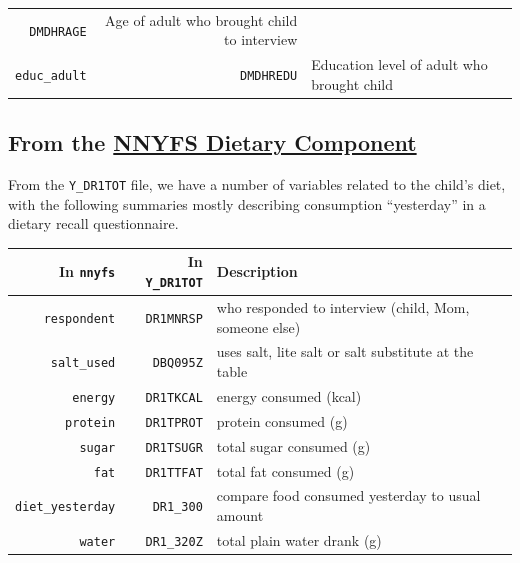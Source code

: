 \documentclass[
]{book}
\begin{document}
\begin{longtable}[]{@{}rrl@{}}
\begin{minipage}[t]{0.16\columnwidth}
\texttt{DMDHRAGE}\strut
\end{minipage} & \begin{minipage}[t]{0.56\columnwidth}\raggedright
Age of adult who brought child to interview\strut
\end{minipage}\tabularnewline
\begin{minipage}[t]{0.20\columnwidth}\raggedleft
\texttt{educ\_adult}\strut
\end{minipage} & \begin{minipage}[t]{0.16\columnwidth}\raggedleft
\texttt{DMDHREDU}\strut
\end{minipage} & \begin{minipage}[t]{0.56\columnwidth}\raggedright
Education level of adult who brought child\strut
\end{minipage}\tabularnewline
\bottomrule
\end{longtable}

\hypertarget{from-the-nnyfs-dietary-component}{%
\subsection{\texorpdfstring{From the \href{https://wwwn.cdc.gov/nchs/nhanes/search/nnyfsdata.aspx?Component=Dietary}{NNYFS Dietary Component}}{From the NNYFS Dietary Component}}\label{from-the-nnyfs-dietary-component}}

From the \texttt{Y\_DR1TOT} file, we have a number of variables related to the child's diet, with the following summaries mostly describing consumption ``yesterday'' in a dietary recall questionnaire.

\begin{longtable}[]{@{}rrl@{}}
\toprule
In \texttt{nnyfs} & In \texttt{Y\_DR1TOT} & Description\tabularnewline
\midrule
\endhead
\texttt{respondent} & \texttt{DR1MNRSP} & who responded to interview (child, Mom, someone else)\tabularnewline
\texttt{salt\_used} & \texttt{DBQ095Z} & uses salt, lite salt or salt substitute at the table\tabularnewline
\texttt{energy} & \texttt{DR1TKCAL} & energy consumed (kcal)\tabularnewline
\texttt{protein} & \texttt{DR1TPROT} & protein consumed (g)\tabularnewline
\texttt{sugar} & \texttt{DR1TSUGR} & total sugar consumed (g)\tabularnewline
\texttt{fat} & \texttt{DR1TTFAT} & total fat consumed (g)\tabularnewline
\texttt{diet\_yesterday} & \texttt{DR1\_300} & compare food consumed yesterday to usual amount\tabularnewline
\texttt{water} & \texttt{DR1\_320Z} & total plain water drank (g)\tabularnewline
\bottomrule
\end{longtable}
\end{document}
